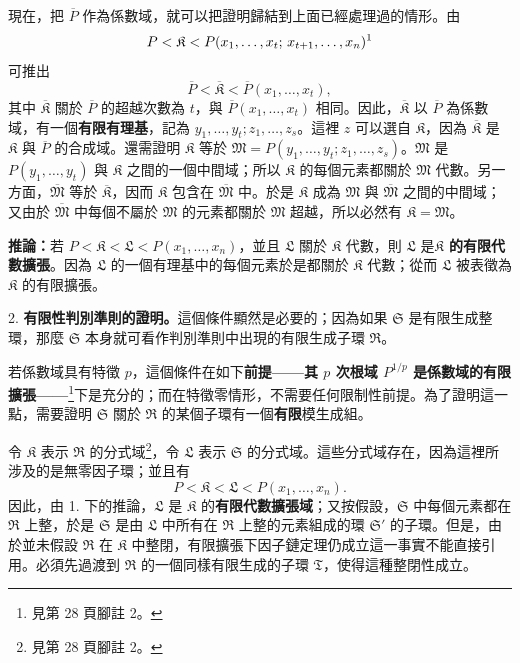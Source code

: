 \documentclass[11pt]{article}
\newcommand{\srcemph}[1]{\textbf{#1}}
\begin{document}
現在，把 $\overline P$ 作為係數域，就可以把證明歸結到上面已經處理過的情形。由
\[
 P<\mathfrak K<P(x_1,\ldots,x_t;\,x_{t+1},\ldots,x_n)\text{\footnotemark}
\]
可推出
\[
 \overline P<\overline{\mathfrak K}<\overline P(x_1,\ldots,x_t),
\]
其中 $\overline{\mathfrak K}$ 關於 $\overline P$ 的超越次數為 $t$，與 $\overline P(x_1,\ldots,x_t)$ 相同。因此，$\overline{\mathfrak K}$ 以 $\overline P$ 為係數域，有一個\srcemph{有限有理基}，記為 $y_1,\ldots,y_t; z_1,\ldots,z_s$。這裡 $z$ 可以選自 $\mathfrak K$，因為 $\overline{\mathfrak K}$ 是 $\mathfrak K$ 與 $\overline P$ 的合成域。還需證明 $\mathfrak K$ 等於 $\mathfrak M=P(y_1,\ldots,y_t;z_1,\ldots,z_s)$。$\mathfrak M$ 是 $P(y_1,\ldots,y_t)$ 與 $\mathfrak K$ 之間的一個中間域；所以 $\mathfrak K$ 的每個元素都關於 $\mathfrak M$ 代數。另一方面，$\overline{\mathfrak M}$ 等於 $\overline{\mathfrak K}$，因而 $\mathfrak K$ 包含在 $\overline{\mathfrak M}$ 中。於是 $\mathfrak K$ 成為 $\mathfrak M$ 與 $\overline{\mathfrak M}$ 之間的中間域；又由於 $\overline{\mathfrak M}$ 中每個不屬於 $\mathfrak M$ 的元素都關於 $\mathfrak M$ 超越，所以必然有 $\mathfrak K=\mathfrak M$。

\srcemph{推論：}若 $P<\mathfrak K<\mathfrak L<P(x_1,\ldots,x_n)$，並且 $\mathfrak L$ 關於 $\mathfrak K$ 代數，則 $\mathfrak L$ 是\srcemph{$\mathfrak K$ 的有限代數擴張}。因為 $\mathfrak L$ 的一個有理基中的每個元素於是都關於 $\mathfrak K$ 代數；從而 $\mathfrak L$ 被表徵為 $\mathfrak K$ 的有限擴張。

2. \srcemph{有限性判別準則的證明。}這個條件顯然是必要的；因為如果 $\mathfrak S$ 是有限生成整環，那麼 $\mathfrak S$ 本身就可看作判別準則中出現的有限生成子環 $\mathfrak R$。

若係數域具有特徵 $p$，這個條件在如下\srcemph{前提——其 $p$ 次根域 $P^{1/p}$ 是係數域的有限擴張——}\footnote{見第 28 頁腳註 2。}下是充分的；而在特徵零情形，不需要任何限制性前提。為了證明這一點，需要證明 $\mathfrak S$ 關於 $\mathfrak R$ 的某個子環有一個\srcemph{有限}模生成組。

令 $\mathfrak K$ 表示 $\mathfrak R$ 的分式域\footnote{見第 28 頁腳註 2。}，令 $\mathfrak L$ 表示 $\mathfrak S$ 的分式域。這些分式域存在，因為這裡所涉及的是無零因子環；並且有
\[
 P<\mathfrak K<\mathfrak L<P(x_1,\ldots,x_n).
\]
因此，由 1. 下的推論，$\mathfrak L$ 是 $\mathfrak K$ 的\srcemph{有限代數擴張域}；又按假設，$\mathfrak S$ 中每個元素都在 $\mathfrak R$ 上整，於是 $\mathfrak S$ 是由 $\mathfrak L$ 中所有在 $\mathfrak R$ 上整的元素組成的環 $\mathfrak S'$ 的子環。但是，由於並未假設 $\mathfrak R$ 在 $\mathfrak K$ 中整閉，有限擴張下因子鏈定理仍成立這一事實不能直接引用。必須先過渡到 $\mathfrak R$ 的一個同樣有限生成的子環 $\mathfrak T$，使得這種整閉性成立。
\end{document}

